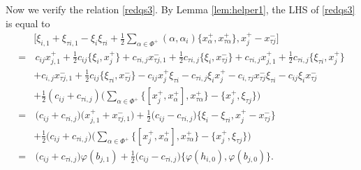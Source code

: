 \documentclass[11pt,reqno]{amsart}
\numberwithin{equation}{section}
\theoremstyle{definition}
\theoremstyle{remark}
\newcommand{\hf}{\tfrac12}
\begin{document}
Now we verify the relation \eqref{redqs3}. By Lemma \ref{lem:helper1}, the LHS of \eqref{redqs3} is equal to
\begin{align*}
&\Big[\xi_{i,1}+\xi_{\tau i,1}-\xi_i\xi_{\tau i}+\hf\sum_{\alpha\in\Phi^+}(\alpha,\alpha_i)\big\{x_\alpha^+,x_{\tau\alpha}^+\big\},x_j^+-x_{\tau j}^-\Big]\\
=&\,c_{ij}x_{j,1}^++\hf c_{ij}\{\xi_i,x_j^+\}+c_{\tau i,j}x_{\tau j,1}^-+\hf c_{\tau i,j}\{\xi_i,x_{\tau j}^-\}+c_{\tau i,j}x_{j,1}^++\hf c_{\tau i,j}\{\xi_{\tau i},x_j^+\}\\
&+c_{i,j}x_{\tau j,1}^-+\hf c_{ij}\{\xi_{\tau i},x_{\tau j}^-\}-c_{ij}x_j^+\xi_{\tau i}-c_{\tau i,j}\xi_ix_j^+-c_{i,\tau j}x_{\tau j}^-\xi_{\tau i}-c_{ij}\xi_ix_{\tau j}^-\\
&+\hf(c_{ij}+c_{\tau i,j})\Big(\sum_{\alpha\in\Phi^+}\big\{[x_j^+,x_\alpha^+],x_{\tau \alpha}^+\big\}-\big\{x_j^+,\xi_{\tau j}\big\}\Big)\\
=&\, \big(c_{ij}+c_{\tau i,j}\big)\big(x_{j,1}^++x_{\tau j,1}^-\big)+\hf\big(c_{ij}-c_{\tau i,j}\big)\big\{\xi_i-\xi_{\tau i},x_j^+-x_{\tau j}^-\big\}\\
&+\hf\big(c_{ij}+c_{\tau i,j}\big)\Big(\sum_{\alpha\in\Phi^+}\big\{[x_j^+,x_\alpha^+],x_{\tau \alpha}^+\big\}-\big\{x_j^+,\xi_{\tau j}\big\}\Big)\\
=&\,\big(c_{ij}+c_{\tau i,j}\big)\varphi(b_{j,1})+\hf\big(c_{ij}-c_{\tau i,j}\big)\big\{\varphi(h_{i,0}),\varphi(b_{j,0})\big\}.
\end{align*}
\end{document}
